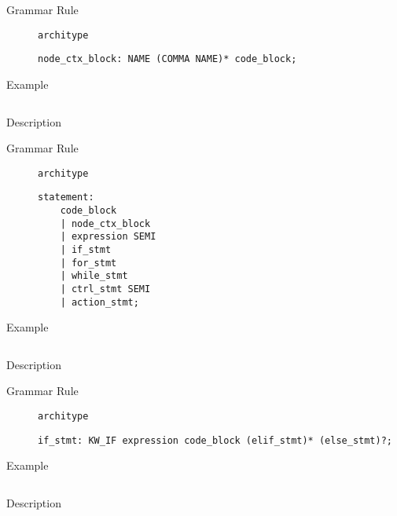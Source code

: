 \begin{description}
    \item[Grammar Rule] \texttt{architype}
          \begin{lstlisting}[style=gram]
node_ctx_block: NAME (COMMA NAME)* code_block;
        \end{lstlisting}
    \item[Example] \texttt{}
          \begin{lstlisting}
        \end{lstlisting}

    \item[Description]
\end{description}


\begin{description}
    \item[Grammar Rule] \texttt{architype}
          \begin{lstlisting}[style=gram]
statement:
    code_block
    | node_ctx_block
    | expression SEMI
    | if_stmt
    | for_stmt
    | while_stmt
    | ctrl_stmt SEMI
    | action_stmt;
        \end{lstlisting}
    \item[Example] \texttt{}
          \begin{lstlisting}
        \end{lstlisting}

    \item[Description]
\end{description}


\begin{description}
    \item[Grammar Rule] \texttt{architype}
          \begin{lstlisting}[style=gram]
if_stmt: KW_IF expression code_block (elif_stmt)* (else_stmt)?;
        \end{lstlisting}
    \item[Example] \texttt{}
          \begin{lstlisting}
        \end{lstlisting}

    \item[Description]
\end{description}



